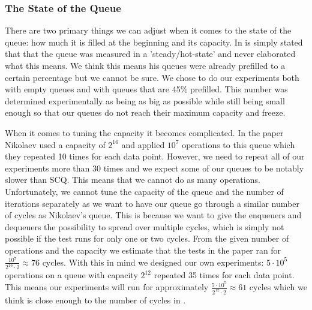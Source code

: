 \documentclass{article}      %
\begin{document}
\subsubsection{The State of the Queue}
\label{sec:state_of_Q}
There are two primary things we can adjust when it comes to the state of the queue: how much it is filled at the beginning and its capacity. In \cite{nikolaev2019scalable} is simply stated that that the queue was measured in a 'steady/hot-state' and never elaborated what this means. We think this means his queues were already prefilled to a certain percentage but we cannot be sure. We chose to do our experiments both with empty queues and with queues that are 45\% prefilled. This number was determined experimentally as being as big as possible while still being small enough so that our queues do not reach their maximum capacity and freeze.

When it comes to tuning the capacity it becomes complicated. In the paper Nikolaev used a capacity of $2^{16}$ and applied $10^7$ operations to this queue which they repeated 10 times for each data point. However, we need to repeat all of our experiments more than 30 times and we expect some of our queues to be notably slower than SCQ. This means that we cannot do as many operations. Unfortunately, we cannot tune the capacity of the queue and the number of iterations separately as we want to have our queue go through a similar number of cycles as Nikolaev's queue. This is because we want to give the enqueuers and dequeuers the possibility to spread over multiple cycles, which is simply not possible if the test runs for only one or two cycles. From the given number of operations and the capacity we estimate that the tests in the paper ran for  $\frac{10^7}{2^{16}\cdot 2} \approx 76$ cycles. With this in mind we designed our own experiments: $5\cdot 10^5$ operations on a queue with capacity $2^{12}$ repeated 35 times for each data point. This means our experiments will run for approximately $\frac{5\cdot 10^5}{2^{12}\cdot 2} \approx 61$ cycles which we think is close enough to the number of cycles in \cite{nikolaev2019scalable}.
\end{document}
